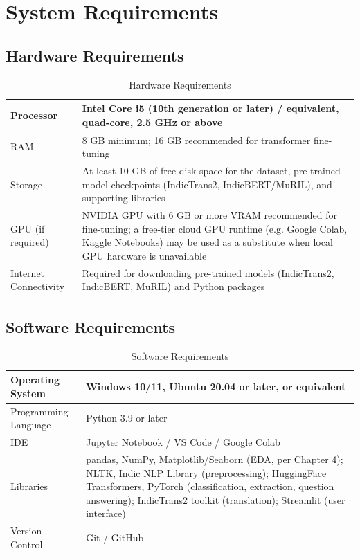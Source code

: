 \section{System Requirements}

\subsection{Hardware Requirements}

\begin{table}[H]
\centering
\caption{Hardware Requirements}
\begin{tabular}{|p{5cm}|p{8cm}|}
\hline
Processor & Intel Core i5 (10th generation or later) / equivalent, quad-core, 2.5 GHz or above\\
\hline
RAM & 8 GB minimum; 16 GB recommended for transformer fine-tuning\\
\hline
Storage & At least 10 GB of free disk space for the dataset, pre-trained model checkpoints (IndicTrans2, IndicBERT/MuRIL), and supporting libraries\\
\hline
GPU (if required) & NVIDIA GPU with 6 GB or more VRAM recommended for fine-tuning; a free-tier cloud GPU runtime (e.g. Google Colab, Kaggle Notebooks) may be used as a substitute when local GPU hardware is unavailable\\
\hline
Internet Connectivity & Required for downloading pre-trained models (IndicTrans2, IndicBERT, MuRIL) and Python packages\\
\hline
\end{tabular}
\end{table}

\subsection{Software Requirements}

\begin{table}[H]
\centering
\caption{Software Requirements}
\begin{tabular}{|p{5cm}|p{8cm}|}
\hline
Operating System & Windows 10/11, Ubuntu 20.04 or later, or equivalent\\
\hline
Programming Language & Python 3.9 or later\\
\hline
IDE & Jupyter Notebook / VS Code / Google Colab\\
\hline
Libraries & pandas, NumPy, Matplotlib/Seaborn (EDA, per Chapter 4); NLTK, Indic NLP Library (preprocessing); HuggingFace Transformers, PyTorch (classification, extraction, question answering); IndicTrans2 toolkit (translation); Streamlit (user interface)\\
\hline
Version Control & Git / GitHub\\
\hline
\end{tabular}
\end{table}


